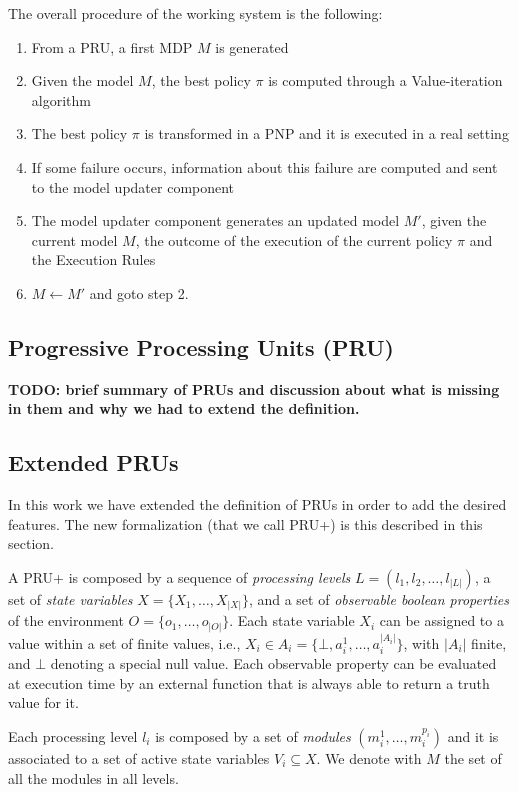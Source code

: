 The overall procedure of the working system is the following:
\begin{enumerate}
\item From a PRU, a first MDP $M$ is generated 
\item Given the model $M$, the best policy $\pi$ is computed through a Value-iteration algorithm
\item The best policy $\pi$ is transformed in a PNP and it is executed in a real setting
\item If some failure occurs, information about this failure are computed and sent to the model updater component
\item The model updater component generates an updated model $M'$, given the current model $M$, the outcome of the execution of the current policy $\pi$ and the Execution Rules
\item $M \leftarrow M'$ and goto step 2. 
\end{enumerate}



\subsection{Progressive Processing Units (PRU)}

{\bf TODO: brief summary of PRUs and discussion about what is missing in them and why we had to extend the definition.}


\subsection{Extended PRUs}

In this work we have extended the definition of PRUs in order to add the desired features. The new formalization (that we call PRU+) is this described in this section.

A PRU+ is composed by a sequence of \emph{processing levels} $L = ( l_1, l_2, \ldots, l_{|L|})$, a set of \emph{state variables} $X = \{ X_1, \ldots, X_{|X|} \}$, and a set of \emph{observable boolean properties} of the environment $O = \{ o_1, \ldots, o_{|O|} \}$.
Each state variable $X_i$ can be assigned to a value within a set of finite values, i.e., $X_i \in A_i = \{ \bot , a_i^1, \ldots, a_i^{|A_i|} \}$, with $|A_i|$ finite, and $\bot$ denoting a special null value. Each observable property can be evaluated at execution time by an external function that is always able to return a truth value for it.

Each processing level $l_i$ is composed by a set of \emph{modules} $( m_i^1, \ldots, m_i^{p_i} )$ and it is associated to a set of active state variables $V_i \subseteq X$.
We denote with $M$ the set of all the modules in all levels.

